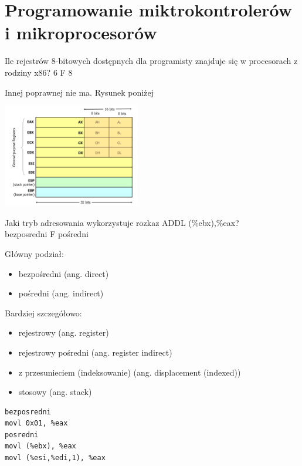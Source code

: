 \setcounter{chapter}{12}
\chapter{Programowanie miktrokontrolerów i mikroprocesorów}
\PartialToc
\setcounter{section}{215}

\answer
{Ile rejestrów 8-bitowych dostępnych dla programisty znajduje się w procesorach z rodziny x86?}
{6}
{F}
{8}
{
	Innej poprawnej nie ma. Rysunek poniżej
	\begin{center}
		\includegraphics[width=6cm]{13/img/x86-registers.png}
	\end{center}
}
\answer
{Jaki tryb adresowania wykorzystuje rozkaz ADDL (\%ebx),\%eax?\\}
{bezposredni}
{F}
{pośredni}
{
	Główny podział:
	\begin{itemize}
		\item bezpośredni (ang. direct)
		\item pośredni (ang. indirect)
	\end{itemize}
	Bardziej szczegółowo:
	\begin{itemize}
		\item rejestrowy (ang. register)
		\item rejestrowy pośredni (ang. register indirect)
		\item z przesunieciem (indeksowanie) (ang. displacement (indexed))
		\item stosowy (ang. stack)
	\end{itemize}
}
\begin{lstlisting}
bezposredni
movl 0x01, %eax
posredni
movl (%ebx), %eax
movl (%esi,%edi,1), %eax

\end{lstlisting}
